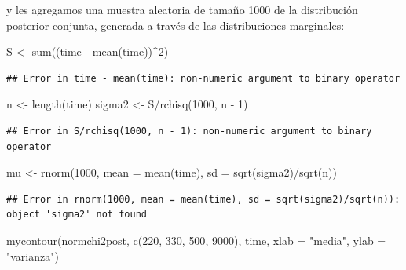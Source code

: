 \documentclass[
  12pt,
]{book}
\newenvironment{Shaded}{\begin{snugshade}}{\end{snugshade}}
\newcommand{\AttributeTok}[1]{\textcolor[rgb]{0.77,0.63,0.00}{#1}}
\newcommand{\DecValTok}[1]{\textcolor[rgb]{0.00,0.00,0.81}{#1}}
\newcommand{\FunctionTok}[1]{\textcolor[rgb]{0.00,0.00,0.00}{#1}}
\newcommand{\NormalTok}[1]{#1}
\newcommand{\OtherTok}[1]{\textcolor[rgb]{0.56,0.35,0.01}{#1}}
\newcommand{\SpecialCharTok}[1]{\textcolor[rgb]{0.00,0.00,0.00}{#1}}
\newcommand{\StringTok}[1]{\textcolor[rgb]{0.31,0.60,0.02}{#1}}
\theoremstyle{definition}
\theoremstyle{definition}
\theoremstyle{definition}
\theoremstyle{definition}
\theoremstyle{remark}
\begin{document}
y les agregamos una muestra aleatoria de tamaño 1000 de la distribución posterior conjunta, generada a través de las distribuciones marginales:

\begin{Shaded}
\begin{Highlighting}[]
\NormalTok{S }\OtherTok{\textless{}{-}} \FunctionTok{sum}\NormalTok{((time }\SpecialCharTok{{-}} \FunctionTok{mean}\NormalTok{(time))}\SpecialCharTok{\^{}}\DecValTok{2}\NormalTok{)}
\end{Highlighting}
\end{Shaded}

\begin{verbatim}
## Error in time - mean(time): non-numeric argument to binary operator
\end{verbatim}

\begin{Shaded}
\begin{Highlighting}[]
\NormalTok{n }\OtherTok{\textless{}{-}} \FunctionTok{length}\NormalTok{(time)}
\NormalTok{sigma2 }\OtherTok{\textless{}{-}}\NormalTok{ S}\SpecialCharTok{/}\FunctionTok{rchisq}\NormalTok{(}\DecValTok{1000}\NormalTok{, n }\SpecialCharTok{{-}} \DecValTok{1}\NormalTok{)}
\end{Highlighting}
\end{Shaded}

\begin{verbatim}
## Error in S/rchisq(1000, n - 1): non-numeric argument to binary operator
\end{verbatim}

\begin{Shaded}
\begin{Highlighting}[]
\NormalTok{mu }\OtherTok{\textless{}{-}} \FunctionTok{rnorm}\NormalTok{(}\DecValTok{1000}\NormalTok{, }\AttributeTok{mean =} \FunctionTok{mean}\NormalTok{(time), }\AttributeTok{sd =} \FunctionTok{sqrt}\NormalTok{(sigma2)}\SpecialCharTok{/}\FunctionTok{sqrt}\NormalTok{(n))}
\end{Highlighting}
\end{Shaded}

\begin{verbatim}
## Error in rnorm(1000, mean = mean(time), sd = sqrt(sigma2)/sqrt(n)): object 'sigma2' not found
\end{verbatim}

\begin{Shaded}
\begin{Highlighting}[]
\FunctionTok{mycontour}\NormalTok{(normchi2post, }\FunctionTok{c}\NormalTok{(}\DecValTok{220}\NormalTok{, }\DecValTok{330}\NormalTok{, }\DecValTok{500}\NormalTok{, }\DecValTok{9000}\NormalTok{), time,}
    \AttributeTok{xlab =} \StringTok{"media"}\NormalTok{, }\AttributeTok{ylab =} \StringTok{"varianza"}\NormalTok{)}
\end{Highlighting}
\end{Shaded}
\end{document}
